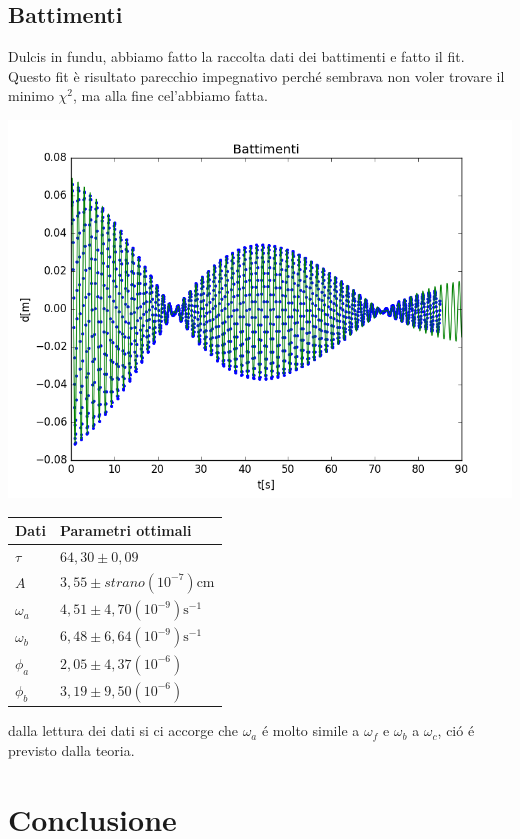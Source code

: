 \documentclass{exam}
\begin{document}
		\subsection {Battimenti}
			Dulcis in fundu, abbiamo fatto la raccolta dati dei battimenti e fatto il fit. Questo fit è risultato parecchio impegnativo perch\'e sembrava non voler trovare il minimo $\chi^2$, ma alla fine cel'abbiamo fatta.\\
			\begin{minipage}{0.5\textwidth}
				\includegraphics[width=\textwidth]{Battimenti}
				\end{minipage}
			\begin{minipage}{0.5\textwidth}
				\begin{tabular}{ll}
					\toprule
					Dati & Parametri ottimali \\
					\midrule
					$\tau$ & $64,30 \pm 0,09$ \\
					$A$ & $3,55 \pm strano(10^{-7})$cm\\
					$\omega_{a}$ & $4,51 \pm 4,70(10^{-9})\textrm{s}^{-1}$\\
					$\omega_{b}$ & $6,48 \pm 6,64(10^{-9})\textrm{s}^{-1}$\\			
					$\phi_{a}$ & $2,05 \pm 4,37(10^{-6})$\\
					$\phi_{b}$ & $3,19 \pm 9,50(10^{-6})$\\
					\bottomrule
				\end{tabular}
			\end{minipage}
			dalla lettura dei dati si ci accorge che $\omega_{a}$ \'e molto simile a $\omega_{f}$ e $\omega_{b}$ a $\omega_{c}$, ci\'o \'e previsto dalla teoria.
	\section{Conclusione}
		
\end{document}
